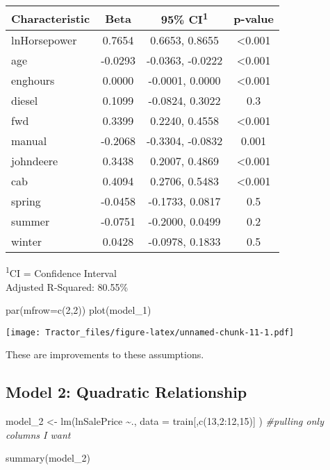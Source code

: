 \documentclass[
]{article}
\newenvironment{Shaded}{\begin{snugshade}}{\end{snugshade}}
\newcommand{\AttributeTok}[1]{\textcolor[rgb]{0.77,0.63,0.00}{#1}}
\newcommand{\CommentTok}[1]{\textcolor[rgb]{0.56,0.35,0.01}{\textit{#1}}}
\newcommand{\DecValTok}[1]{\textcolor[rgb]{0.00,0.00,0.81}{#1}}
\newcommand{\FunctionTok}[1]{\textcolor[rgb]{0.00,0.00,0.00}{#1}}
\newcommand{\NormalTok}[1]{#1}
\newcommand{\OtherTok}[1]{\textcolor[rgb]{0.56,0.35,0.01}{#1}}
\newcommand{\SpecialCharTok}[1]{\textcolor[rgb]{0.00,0.00,0.00}{#1}}
\begin{document}
\setlength{\LTpost}{0mm}
\begin{longtable}{lccc}
\toprule
\textbf{Characteristic} & \textbf{Beta} & \textbf{95\% CI}\textsuperscript{1} & \textbf{p-value} \\ 
\midrule
lnHorsepower & 0.7654 & 0.6653, 0.8655 & <0.001 \\ 
age & -0.0293 & -0.0363, -0.0222 & <0.001 \\ 
enghours & 0.0000 & -0.0001, 0.0000 & <0.001 \\ 
diesel & 0.1099 & -0.0824, 0.3022 & 0.3 \\ 
fwd & 0.3399 & 0.2240, 0.4558 & <0.001 \\ 
manual & -0.2068 & -0.3304, -0.0832 & 0.001 \\ 
johndeere & 0.3438 & 0.2007, 0.4869 & <0.001 \\ 
cab & 0.4094 & 0.2706, 0.5483 & <0.001 \\ 
spring & -0.0458 & -0.1733, 0.0817 & 0.5 \\ 
summer & -0.0751 & -0.2000, 0.0499 & 0.2 \\ 
winter & 0.0428 & -0.0978, 0.1833 & 0.5 \\ 
\bottomrule
\end{longtable}
\begin{minipage}{\linewidth}
\textsuperscript{1}CI = Confidence Interval\\
Adjusted R-Squared: 80.55\%\\
\end{minipage}

\begin{Shaded}
\begin{Highlighting}[]
\FunctionTok{par}\NormalTok{(}\AttributeTok{mfrow=}\FunctionTok{c}\NormalTok{(}\DecValTok{2}\NormalTok{,}\DecValTok{2}\NormalTok{))}
\FunctionTok{plot}\NormalTok{(model\_1)}
\end{Highlighting}
\end{Shaded}

\texttt{[image: Tractor\_files/figure-latex/unnamed-chunk-11-1.pdf]}

These are improvements to these assumptions.

\hypertarget{model-2-quadratic-relationship}{%
\subsection{Model 2: Quadratic
Relationship}\label{model-2-quadratic-relationship}}

\begin{Shaded}
\begin{Highlighting}[]
\NormalTok{model\_2 }\OtherTok{\textless{}{-}} \FunctionTok{lm}\NormalTok{(lnSalePrice }\SpecialCharTok{\textasciitilde{}}\NormalTok{., }\AttributeTok{data =}\NormalTok{ train[,}\FunctionTok{c}\NormalTok{(}\DecValTok{13}\NormalTok{,}\DecValTok{2}\SpecialCharTok{:}\DecValTok{12}\NormalTok{,}\DecValTok{15}\NormalTok{)] ) }\CommentTok{\#pulling only columns I want}

\FunctionTok{summary}\NormalTok{(model\_2)}
\end{Highlighting}
\end{Shaded}
\end{document}
